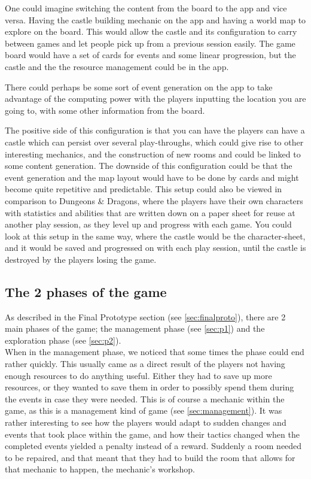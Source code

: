 One could imagine switching the content from the board to the app and vice versa. Having the castle building mechanic on the app and having a world map to explore on the board.
This would allow the castle and its configuration to carry between games and let people pick up from a previous session easily. 
The game board would have a set of cards for events and some linear progression, but the castle and the the resource management could be in the app. 

There could perhaps be some sort of event generation on the app to take advantage of the computing power with the players inputting the location you are going to, with some other information from the board. 

The positive side of this configuration is that you can have the players can have a castle which can persist over several play-throughs, which could give rise to other interesting mechanics, and the construction of new rooms and could be linked to some content generation. 
The downside of this configuration could be that the event generation and the map layout would have to be done by cards and might become quite repetitive and predictable. This setup could also be viewed in comparison to Dungeons \& Dragons\cite{game:dnd}, where the players have their own characters with statistics and abilities that are written down on a paper sheet for reuse at another play session, as they level up and progress with each game. You could look at this setup in the same way, where the castle would be the character-sheet, and it would be saved and progressed on with each play session, until the castle is destroyed by the players losing the game.

\subsection{The 2 phases of the game}

As described in the Final Prototype section (see \ref{sec:finalproto}), there are 2 main phases of the game; the management phase (see \ref{sec:p1}) and the exploration phase (see \ref{sec:p2}).\\When in the management phase, we noticed that some times the phase could end rather quickly. This usually came as a direct result of the players not having enough resources to do anything useful. Either they had to save up more resources, or they wanted to save them in order to possibly spend them during the events in case they were needed. This is of course a mechanic within the game, as this is a management kind of game (see \ref{sec:management}). It was rather interesting to see how the players would adapt to sudden changes and events that took place within the game, and how their tactics changed when the completed events yielded a penalty instead of a reward. Suddenly a room needed to be repaired, and that meant that they had to build the room that allows for that mechanic to happen, the mechanic's workshop.


